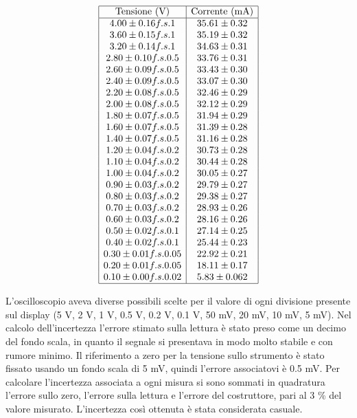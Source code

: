 \documentclass[a4paper,11pt]{article}
\begin{document}
    \begin{minipage}{0.4\textwidth}
        \[
\begin{array}{|c|c|}
\hline
\text{Tensione (V)} & \text{Corrente (mA)} \\ \hline
4.00 \pm 0.16 f.s. 1 & 35.61 \pm 0.32 \\ 
3.60 \pm 0.15 f.s. 1 & 35.19 \pm 0.32 \\ 
3.20 \pm 0.14 f.s. 1 & 34.63 \pm 0.31 \\ 
2.80 \pm 0.10 f.s. 0.5 & 33.76 \pm 0.31 \\ 
2.60 \pm 0.09 f.s. 0.5 & 33.43 \pm 0.30 \\ 
2.40 \pm 0.09 f.s. 0.5 & 33.07 \pm 0.30 \\ 
2.20 \pm 0.08 f.s. 0.5 & 32.46 \pm 0.29 \\ 
2.00 \pm 0.08 f.s. 0.5 & 32.12 \pm 0.29 \\ 
1.80 \pm 0.07 f.s. 0.5 & 31.94 \pm 0.29 \\ 
1.60 \pm 0.07 f.s. 0.5 & 31.39 \pm 0.28 \\ 
1.40 \pm 0.07 f.s. 0.5 & 31.16 \pm 0.28 \\ 
1.20 \pm 0.04 f.s. 0.2 & 30.73 \pm 0.28 \\ 
1.10 \pm 0.04 f.s. 0.2 & 30.44 \pm 0.28 \\ 
1.00 \pm 0.04 f.s. 0.2 & 30.05 \pm 0.27 \\ 
0.90 \pm 0.03 f.s. 0.2 & 29.79 \pm 0.27 \\ 
0.80 \pm 0.03 f.s. 0.2 & 29.38 \pm 0.27 \\ 
0.70 \pm 0.03 f.s. 0.2 & 28.93 \pm 0.26 \\ 
0.60 \pm 0.03 f.s. 0.2 & 28.16 \pm 0.26 \\ 
0.50 \pm 0.02 f.s. 0.1 & 27.14 \pm 0.25 \\ 
0.40 \pm 0.02 f.s. 0.1 & 25.44 \pm 0.23 \\ 
0.30 \pm 0.01 f.s. 0.05 & 22.92 \pm 0.21 \\ 
0.20 \pm 0.01 f.s. 0.05 & 18.11 \pm 0.17 \\ 
0.10 \pm 0.00 f.s. 0.02 & 5.83 \pm 0.062 \\ \hline

\end{array}\label{tab::dati_200}
\]    
    \end{minipage}


L'oscilloscopio aveva diverse possibili scelte per il valore di ogni divisione presente sul display (5 V, 2 V, 1 V, 0.5 V, 0.2 V, 0.1 V, 50 mV, 20 mV, 10 mV, 5 mV). Nel calcolo dell'incertezza l'errore stimato sulla lettura è stato preso come un decimo del fondo scala, in quanto il segnale si presentava in modo molto stabile e con rumore minimo. Il riferimento a zero per la tensione sullo strumento è stato fissato usando un fondo scala di 5 mV, quindi l'errore associatovi è 0.5 mV. Per calcolare l'incertezza associata a ogni misura si sono sommati in quadratura l'errore sullo zero, l'errore sulla lettura e l'errore del costruttore, pari al 3 \% del valore misurato. L'incertezza così ottenuta è stata considerata casuale.
 
\end{document}

